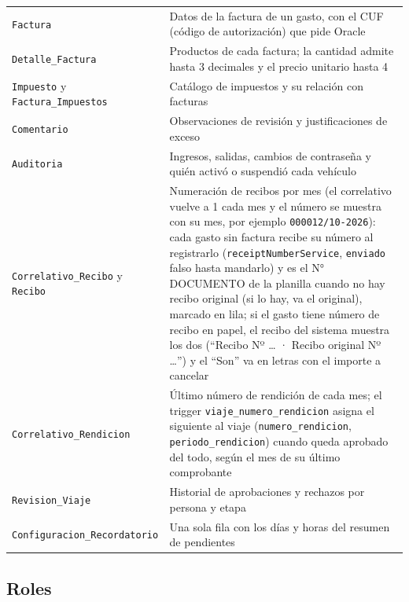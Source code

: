 \documentclass[11pt,letterpaper]{article}
\newcommand{\code}[1]{\nolinkurl{#1}}
\begin{document}
\begin{xltabular}{\textwidth}{L{4.8cm} Y}
\code{Factura} & Datos de la factura de un gasto, con el CUF (código de autorización) que pide Oracle \\
\code{Detalle_Factura} & Productos de cada factura; la cantidad admite hasta 3 decimales y el precio unitario hasta 4 \\
 \code{Impuesto} y \code{Factura_Impuestos} & Catálogo de impuestos y su relación con facturas \\
\code{Comentario} & Observaciones de revisión y justificaciones de exceso \\
 \code{Auditoria} & Ingresos, salidas, cambios de contraseña y quién activó o suspendió cada vehículo \\
\code{Correlativo_Recibo} y \code{Recibo} & Numeración de recibos por mes (el correlativo vuelve a 1 cada mes y el número se muestra con su mes, por ejemplo \code{000012/10-2026}): cada gasto sin factura recibe su número al registrarlo (\code{receiptNumberService}, \code{enviado} falso hasta mandarlo) y es el N° DOCUMENTO de la planilla cuando no hay recibo original (si lo hay, va el original), marcado en lila; si el gasto tiene número de recibo en papel, el recibo del sistema muestra los dos (``Recibo Nº … · Recibo original Nº …'') y el ``Son'' va en letras con el importe a cancelar \\
 \code{Correlativo_Rendicion} & Último número de rendición de cada mes; el trigger \code{viaje_numero_rendicion} asigna el siguiente al viaje (\code{numero_rendicion}, \code{periodo_rendicion}) cuando queda aprobado del todo, según el mes de su último comprobante \\
 \code{Revision_Viaje} & Historial de aprobaciones y rechazos por persona y etapa \\
\code{Configuracion_Recordatorio} & Una sola fila con los días y horas del resumen de pendientes \\
\end{xltabular}

\subsection{Roles}
\end{document}
